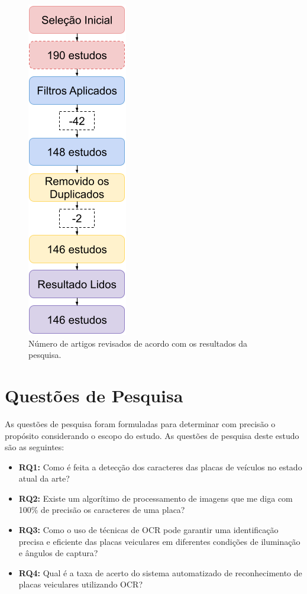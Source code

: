 \documentclass[conference]{IEEEtran}
\begin{document}
\begin{figure}[htbp]
	\centerline{\includegraphics{img3.png}}
	\caption{Número de artigos revisados de acordo com os resultados da pesquisa.}
	\label{img3}
\end{figure}

\section{Questões de Pesquisa}

As questões de pesquisa foram formuladas para determinar com precisão o propósito considerando o escopo do estudo. As questões de pesquisa deste estudo são as seguintes:

\begin{itemize}
	\item \textbf{RQ1:} Como é feita a detecção dos caracteres das placas de veículos no estado atual da arte?
	\item \textbf{RQ2:} Existe um algorítimo de processamento de imagens que me diga com 100\% de precisão os caracteres de uma placa?
	\item \textbf{RQ3:} Como o uso de técnicas de OCR pode garantir uma identificação precisa e eficiente das placas veiculares em diferentes condições de iluminação e ângulos de captura?
	\item \textbf{RQ4:} Qual é a taxa de acerto do sistema automatizado de reconhecimento de placas veiculares utilizando OCR?
\end{itemize}
\end{document}

